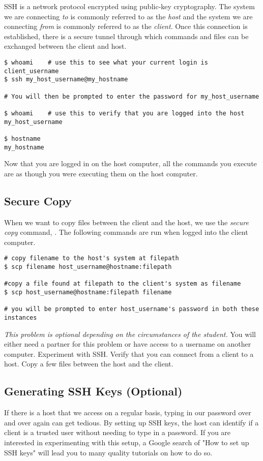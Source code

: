 SSH is a network protocol encrypted using public-key cryptography. The system we are connecting \emph{to} is commonly referred to as the \emph{host} and the system we are connecting \emph{from} is commonly referred to as the \emph{client}. Once this connection is established, there is a secure tunnel through which commands and files can be exchanged between the client and host.

\begin{lstlisting}
$ whoami    # use this to see what your current login is
client_username
$ ssh my_host_username@my_hostname

# You will then be prompted to enter the password for my_host_username

$ whoami    # use this to verify that you are logged into the host
my_host_username

$ hostname
my_hostname
\end{lstlisting}

Now that you are logged in on the host computer, all the commands you execute are as though you were executing them on the host computer.

\subsection*{Secure Copy}

When we want to copy files between the client and the host, we use the \emph{secure copy} command, . The following commands are run when logged into the client computer.

\begin{lstlisting}
# copy filename to the host's system at filepath
$ scp filename host_username@hostname:filepath

#copy a file found at filepath to the client's system as filename
$ scp host_username@hostname:filepath filename

# you will be prompted to enter host_username's password in both these instances 
\end{lstlisting}

\begin{problem}
\emph{This problem is optional depending on the circumstances of the student.}
You will either need a partner for this problem or have access to a username on another computer. Experiment with SSH. Verify that you can connect from a client to a host. Copy a few files between the host and the client.
\end{problem}

\subsection*{Generating SSH Keys (Optional)}
If there is a host that we access on a regular basis, typing in our password over and over again can get tedious. By setting up SSH keys, the host can identify if a client is a trusted user without needing to type in a password. If you are interested in experimenting with this setup, a Google search of "How to set up SSH keys" will lead you to many quality tutorials on how to do so.

